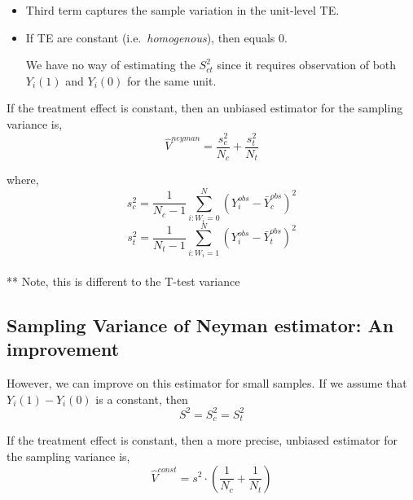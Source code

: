 \documentclass[
  letterpaper,
  DIV=11,
  numbers=noendperiod]{scrreprt}
\theoremstyle{definition}
\theoremstyle{remark}
\begin{document}
\begin{itemize}
\item
  Third term captures the sample variation in the unit-level TE.
\item
  If TE are constant (i.e.~\emph{homogenous}), then equals 0.

  We have no way of estimating the \(S^2_{ct}\) since it requires
  observation of both \(Y_i(1)\) and \(Y_i(0)\) for the same unit.
\end{itemize}

\begin{tcolorbox}[enhanced jigsaw, breakable, colframe=quarto-callout-important-color-frame, toptitle=1mm, toprule=.15mm, opacitybacktitle=0.6, opacityback=0, rightrule=.15mm, titlerule=0mm, colback=white, bottomtitle=1mm, title={Theorem: Neyman's variance estimator}, arc=.35mm, coltitle=black, colbacktitle=quarto-callout-important-color!10!white, leftrule=.75mm, bottomrule=.15mm, left=2mm]

If the treatment effect is constant, then an unbiased estimator for the
sampling variance is, \[
        \hat{V}^{neyman} = \frac{s^2_c}{N_c}+\frac{s^2_t}{N_t}
\]

\end{tcolorbox}

where, \[
        s^2_c = \frac{1}{N_c-1}\sum_{i:W_i=0}^N (Y_i^{obs}-\bar{Y}^{obs}_c)^2
\] \[
        s^2_t = \frac{1}{N_t-1}\sum_{i:W_i=1}^N (Y_i^{obs}-\bar{Y}^{obs}_t)^2
\]\\
** Note, this is different to the T-test variance

\hypertarget{sampling-variance-of-neyman-estimator-an-improvement}{%
\subsection{Sampling Variance of Neyman estimator: An
improvement}\label{sampling-variance-of-neyman-estimator-an-improvement}}

However, we can improve on this estimator for small samples. If we
assume that \(Y_i(1)-Y_i(0)\) is a constant, then \[
S^2 = S^2_c=S^2_t
\]

\begin{tcolorbox}[enhanced jigsaw, breakable, colframe=quarto-callout-important-color-frame, toptitle=1mm, toprule=.15mm, opacitybacktitle=0.6, opacityback=0, rightrule=.15mm, titlerule=0mm, colback=white, bottomtitle=1mm, title={Constant variance estimator}, arc=.35mm, coltitle=black, colbacktitle=quarto-callout-important-color!10!white, leftrule=.75mm, bottomrule=.15mm, left=2mm]

If the treatment effect is constant, then a more precise, unbiased
estimator for the sampling variance is, \[
            \hat{V}^{const} = s^2\cdot\left(\frac{1}{N_c}+\frac{1}{N_t}\right)
\]

\end{tcolorbox}
\end{document}

